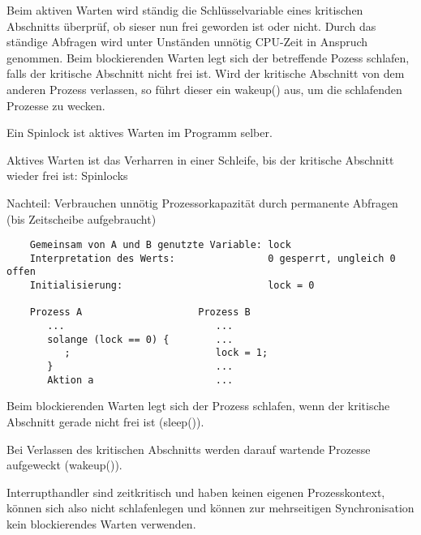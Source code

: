 \begin{answer}
Beim aktiven Warten wird ständig die Schlüsselvariable eines kritischen Abschnitts überprüf, ob sieser nun frei geworden ist oder nicht. Durch das ständige Abfragen wird unter Unständen unnötig CPU-Zeit in Anspruch genommen.
Beim blockierenden Warten legt sich der betreffende Pozess schlafen, falls der kritische Abschnitt nicht frei ist. Wird der kritische Abschnitt von dem anderen Prozess verlassen, so führt dieser ein wakeup() aus, um die schlafenden Prozesse zu wecken.
\end{answer}

\begin{answer}
Ein Spinlock ist aktives Warten im Programm selber.
\end{answer}

\begin{answer}
Aktives Warten ist das Verharren in einer Schleife, bis der kritische Abschnitt wieder frei ist: Spinlocks

Nachteil: Verbrauchen unnötig Prozessorkapazität durch permanente Abfragen (bis Zeitscheibe aufgebraucht)

\begin{verbatim}
    Gemeinsam von A und B genutzte Variable: lock
    Interpretation des Werts:                0 gesperrt, ungleich 0 offen 
    Initialisierung:                         lock = 0
           
    Prozess A                    Prozess B
       ...                          ...
       solange (lock == 0) {        ...
          ;                         lock = 1;
       }                            ...
       Aktion a                     ...
\end{verbatim}
\end{answer}

\begin{answer}
Beim blockierenden Warten legt sich der Prozess schlafen, wenn der kritische Abschnitt gerade nicht frei ist (sleep()).

Bei Verlassen des kritischen Abschnitts werden darauf wartende Prozesse aufgeweckt (wakeup()).

Interrupthandler sind zeitkritisch und haben keinen eigenen Prozesskontext, können sich also nicht schlafenlegen und können zur mehrseitigen Synchronisation kein blockierendes Warten verwenden.
\end{answer}

